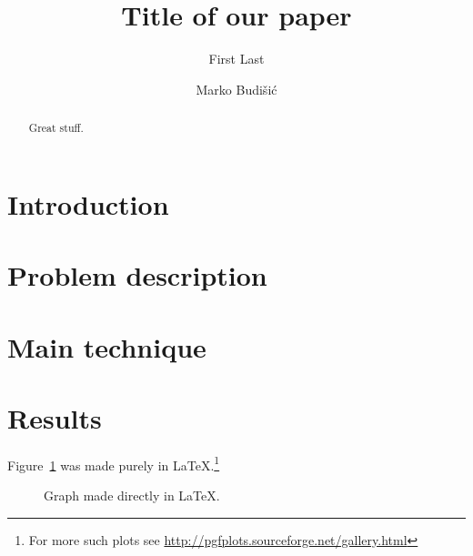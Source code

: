 \documentclass{amsart}
\begin{document}
\title{Title of our paper}

\author{First Last}
\address{Department of Mathematics, Clarkson University,
Potsdam, NY}

\author{Marko Budi\v{s}i\'c}
\address{Department of Mathematics, Clarkson University,
Potsdam, NY}

\begin{abstract}
Great stuff.
\end{abstract}

\maketitle %
\tableofcontents %

\section{Introduction}

\section{Problem description}

\section{Main technique}

\section{Results}

Figure~\ref{fig:csvfig} was made purely in \LaTeX.\footnote{For more such plots see \url{http://pgfplots.sourceforge.net/gallery.html}}

\begin{figure}[htb]
  \centering
\caption{Graph made directly in LaTeX.}\label{fig:csvfig}
\end{figure}
\end{document}
